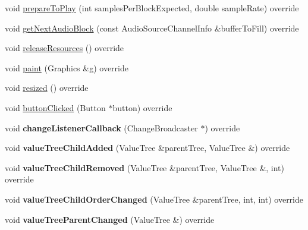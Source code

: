 \begin{DoxyCompactItemize}
\item 
void \mbox{\hyperlink{class_main_component_a3ce1d04f8a20bcc54454e5e94017c5ff}{prepare\+To\+Play}} (int samples\+Per\+Block\+Expected, double sample\+Rate) override
\item 
void \mbox{\hyperlink{class_main_component_a3c29a96205065fbe01eb6e0576f0ffa3}{get\+Next\+Audio\+Block}} (const Audio\+Source\+Channel\+Info \&buffer\+To\+Fill) override
\item 
void \mbox{\hyperlink{class_main_component_a38548494a56d6085df37edb026d3184d}{release\+Resources}} () override
\item 
void \mbox{\hyperlink{class_main_component_a42262770b7a79a2f5ac650aa96a3a45c}{paint}} (Graphics \&g) override
\item 
void \mbox{\hyperlink{class_main_component_a339148bc43089300e10d5883a0a80726}{resized}} () override
\item 
void \mbox{\hyperlink{class_main_component_a88cdd4473b3fd8054e3805fb70c323ff}{button\+Clicked}} (Button $\ast$button) override
\item 
\mbox{\label{class_main_component_aa26e1cdc688e4dd7261d66d2948dc3e6}} 
void {\bfseries change\+Listener\+Callback} (Change\+Broadcaster $\ast$) override
\item 
\mbox{\label{class_main_component_aa79ec6bf89cb6b60c9a5099c6f8fd3e9}} 
void {\bfseries value\+Tree\+Child\+Added} (Value\+Tree \&parent\+Tree, Value\+Tree \&) override
\item 
\mbox{\label{class_main_component_a26a8ef992172649a190e351dd185ded8}} 
void {\bfseries value\+Tree\+Child\+Removed} (Value\+Tree \&parent\+Tree, Value\+Tree \&, int) override
\item 
\mbox{\label{class_main_component_a10c839e7cdb4f5b6d37bdc8818e1d2e8}} 
void {\bfseries value\+Tree\+Child\+Order\+Changed} (Value\+Tree \&parent\+Tree, int, int) override
\item 
\mbox{\label{class_main_component_a37b10a46198211175fef1f0f3cbd5e12}} 
void {\bfseries value\+Tree\+Parent\+Changed} (Value\+Tree \&) override
\item 
\mbox{\label{class_main_component_a996b1fe48764a7dd5c4f9b8372e0698e}} 

\end{DoxyCompactItemize}
